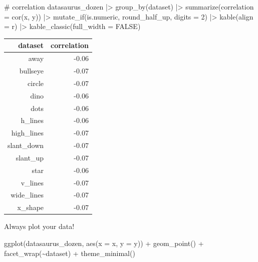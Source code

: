 \documentclass[
  letterpaper,
  DIV=11,
  numbers=noendperiod]{scrreprt}
\newenvironment{Shaded}{\begin{snugshade}}{\end{snugshade}}
\newcommand{\AttributeTok}[1]{\textcolor[rgb]{0.40,0.45,0.13}{#1}}
\newcommand{\CommentTok}[1]{\textcolor[rgb]{0.37,0.37,0.37}{#1}}
\newcommand{\ConstantTok}[1]{\textcolor[rgb]{0.56,0.35,0.01}{#1}}
\newcommand{\DecValTok}[1]{\textcolor[rgb]{0.68,0.00,0.00}{#1}}
\newcommand{\FunctionTok}[1]{\textcolor[rgb]{0.28,0.35,0.67}{#1}}
\newcommand{\NormalTok}[1]{\textcolor[rgb]{0.00,0.23,0.31}{#1}}
\newcommand{\SpecialCharTok}[1]{\textcolor[rgb]{0.37,0.37,0.37}{#1}}
\newcommand{\StringTok}[1]{\textcolor[rgb]{0.13,0.47,0.30}{#1}}
\begin{document}
\begin{Shaded}
\begin{Highlighting}[]
\CommentTok{\# correlation}
\NormalTok{datasaurus\_dozen }\SpecialCharTok{|\textgreater{}}
  \FunctionTok{group\_by}\NormalTok{(dataset) }\SpecialCharTok{|\textgreater{}}
  \FunctionTok{summarize}\NormalTok{(}\AttributeTok{correlation =} \FunctionTok{cor}\NormalTok{(x, y)) }\SpecialCharTok{|\textgreater{}}
  \FunctionTok{mutate\_if}\NormalTok{(is.numeric, round\_half\_up, }\AttributeTok{digits =} \DecValTok{2}\NormalTok{) }\SpecialCharTok{|\textgreater{}}
  \FunctionTok{kable}\NormalTok{(}\AttributeTok{align =} \StringTok{\textquotesingle{}r\textquotesingle{}}\NormalTok{) }\SpecialCharTok{|\textgreater{}}
  \FunctionTok{kable\_classic}\NormalTok{(}\AttributeTok{full\_width =} \ConstantTok{FALSE}\NormalTok{)}
\end{Highlighting}
\end{Shaded}

\begin{longtable*}[t]{rr}
\toprule
dataset & correlation\\
\midrule
away & -0.06\\
bullseye & -0.07\\
circle & -0.07\\
dino & -0.06\\
dots & -0.06\\
\addlinespace
h\_lines & -0.06\\
high\_lines & -0.07\\
slant\_down & -0.07\\
slant\_up & -0.07\\
star & -0.06\\
\addlinespace
v\_lines & -0.07\\
wide\_lines & -0.07\\
x\_shape & -0.07\\
\bottomrule
\end{longtable*}

Always plot your data!

\begin{Shaded}
\begin{Highlighting}[]
\FunctionTok{ggplot}\NormalTok{(datasaurus\_dozen, }\FunctionTok{aes}\NormalTok{(}\AttributeTok{x =}\NormalTok{ x, }\AttributeTok{y =}\NormalTok{ y)) }\SpecialCharTok{+}
  \FunctionTok{geom\_point}\NormalTok{() }\SpecialCharTok{+}
  \FunctionTok{facet\_wrap}\NormalTok{(}\SpecialCharTok{\textasciitilde{}}\NormalTok{dataset) }\SpecialCharTok{+}
  \FunctionTok{theme\_minimal}\NormalTok{()}
\end{Highlighting}
\end{Shaded}
\end{document}
